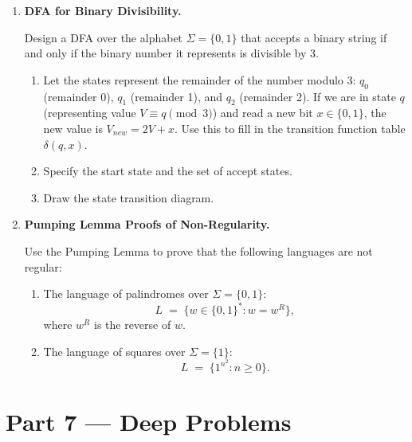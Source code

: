 \documentclass[12pt, a4paper]{book}
\begin{document}
\begin{problembox}
\begin{enumerate}[label=\textbf{P\arabic*.}]
  \item \textbf{DFA for Binary Divisibility.}
  
        Design a DFA over the alphabet $\Sigma = \{0, 1\}$ that accepts a binary string if and only if the binary number it represents is divisible by 3.
        \begin{enumerate}[label=(\alph*)]
          \item Let the states represent the remainder of the number modulo 3: $q_0$ (remainder 0), $q_1$ (remainder 1), and $q_2$ (remainder 2).
                If we are in state $q$ (representing value $V \equiv q \pmod 3$) and read a new bit $x \in \{0, 1\}$, the new value is $V_{new} = 2V + x$.
                Use this to fill in the transition function table $\delta(q, x)$.
          \item Specify the start state and the set of accept states.
          \item Draw the state transition diagram.
        \end{enumerate}

  \item \textbf{Pumping Lemma Proofs of Non-Regularity.}
  
        Use the Pumping Lemma to prove that the following languages are not regular:
        \begin{enumerate}[label=(\alph*)]
          \item The language of palindromes over $\Sigma = \{0, 1\}$:
                \[
                  L \;=\; \{w \in \{0,1\}^* : w = w^R\},
                \]
                where $w^R$ is the reverse of $w$.
          \item The language of squares over $\Sigma = \{1\}$:
                \[
                  L \;=\; \{1^{n^2} : n \ge 0\}.
                \]
        \end{enumerate}
\end{enumerate}
\end{problembox}

\newpage

\section{Part 7 --- Deep Problems}
\end{document}
